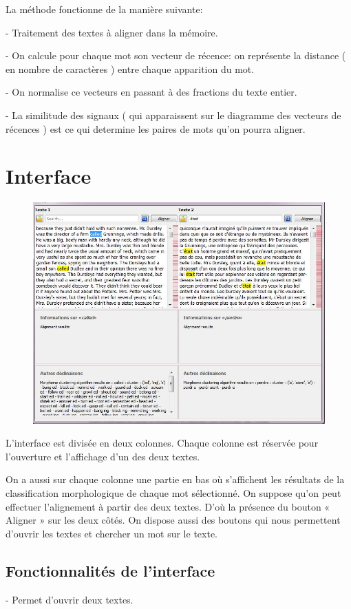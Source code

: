 \documentclass[11pt, oneside]{article}   	%
\begin{document}
La méthode fonctionne de la manière suivante: 

- Traitement des textes à aligner dans la mémoire.

- On calcule pour chaque mot son vecteur de récence: on représente la distance ( en nombre de caractères ) entre chaque apparition du mot.

- On normalise ce vecteurs en passant à des fractions du texte entier.

- La similitude des signaux ( qui apparaissent sur le diagramme des vecteurs de récences ) est ce qui determine les paires de mots qu'on pourra aligner.

\section{Interface}
\begin{figure}[h!]
\centering
\includegraphics[width = 400pt]{interface.jpg}
\end{figure}

L’interface est divisée en deux colonnes. Chaque colonne est réservée pour l’ouverture et l’affichage d’un des deux textes.

On a aussi sur chaque colonne une partie en bas où s’affichent les résultats de la classification morphologique de chaque mot sélectionné.
On suppose qu’on peut effectuer l’alignement à partir des deux textes. D’où la présence du bouton « Aligner » sur les deux côtés.
On dispose aussi des boutons qui nous permettent d’ouvrir les textes et chercher un mot sur le texte.


\subsection{Fonctionnalités de l'interface}
-	Permet d’ouvrir deux textes.
\end{document}
